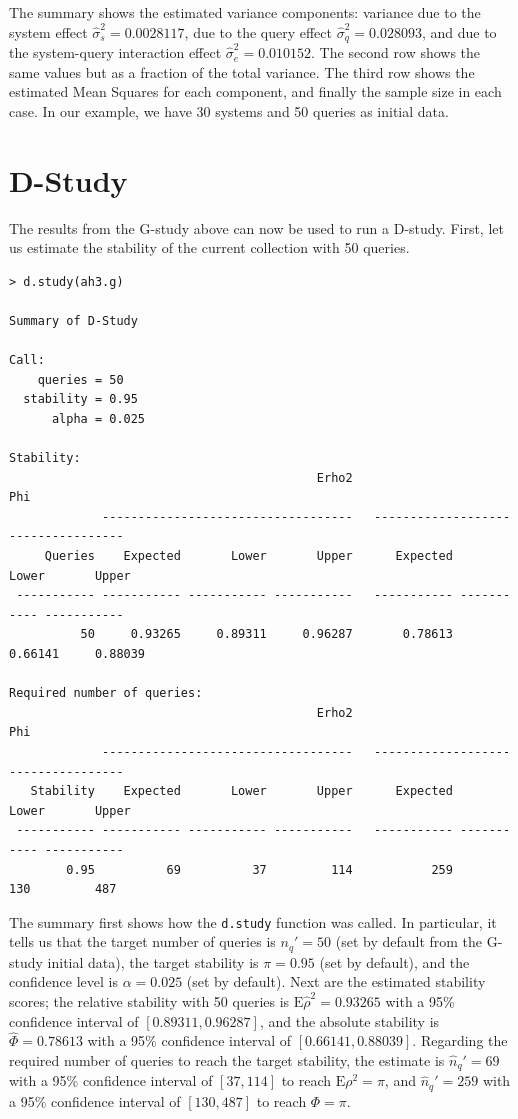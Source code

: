 \documentclass[twoside]{article}
\begin{document}
The summary shows the estimated variance components: variance due to the system effect $\hat\sigma_s^2=0.0028117$, due to the query effect $\hat\sigma_q^2=0.028093$, and due to the system-query interaction effect $\hat\sigma_e^2=0.010152$.
The second row shows the same values but as a fraction of the total variance. The third row shows the estimated Mean Squares for each component, and finally the sample size in each case. In our example, we have 30 systems and 50 queries as initial data.

\section{D-Study}

The results from the G-study above can now be used to run a D-study. First, let us estimate the stability of the current collection with 50 queries.

{\small\begin{verbatim}
> d.study(ah3.g)

Summary of D-Study

Call:
    queries = 50 
  stability = 0.95 
      alpha = 0.025 

Stability:
                                           Erho2                                   Phi
             -----------------------------------   -----------------------------------
     Queries    Expected       Lower       Upper      Expected       Lower       Upper
 ----------- ----------- ----------- -----------   ----------- ----------- -----------
          50     0.93265     0.89311     0.96287       0.78613     0.66141     0.88039 

Required number of queries:
                                           Erho2                                   Phi
             -----------------------------------   -----------------------------------
   Stability    Expected       Lower       Upper      Expected       Lower       Upper
 ----------- ----------- ----------- -----------   ----------- ----------- -----------
        0.95          69          37         114           259         130         487
\end{verbatim}}

The summary first shows how the \texttt{d.study} function was called. In particular, it tells us that the target number of queries is $n_q'=50$ (set by default from the G-study initial data), the target stability is $\pi=0.95$ (set by default), and the confidence level is $\alpha=0.025$ (set by default).
Next are the estimated stability scores; the relative stability with 50 queries is $\text{E}\hat\rho^2=0.93265$ with a 95\% confidence interval of $[0.89311, 0.96287]$, and the absolute stability is $\hat\Phi=0.78613$ with a 95\% confidence interval of $[0.66141, 0.88039]$.
Regarding the required number of queries to reach the target stability, the estimate is $\hat{n}_q'=69$ with a 95\% confidence interval of $[37, 114]$ to reach $\text{E}\rho^2=\pi$, and $\hat{n}_q'=259$ with a 95\% confidence interval of $[130, 487]$ to reach $\Phi=\pi$.
\end{document}
